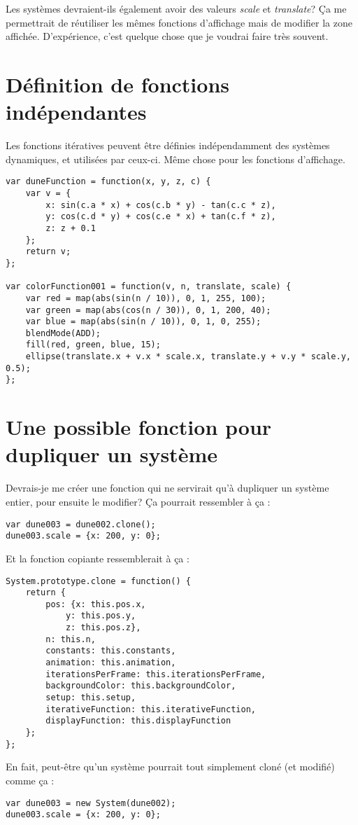 Les systèmes devraient-ils également avoir des valeurs \textit{scale} et \textit{translate}? Ça me permettrait de réutiliser les mêmes fonctions d'affichage mais de modifier la zone affichée. D'expérience, c'est quelque chose que je voudrai faire très souvent.

\newpage
\section{Définition de fonctions indépendantes}
Les fonctions itératives peuvent être définies indépendamment des systèmes dynamiques, et utilisées par ceux-ci. Même chose pour les fonctions d'affichage.
\begin{lstlisting}
var duneFunction = function(x, y, z, c) {
    var v = {
        x: sin(c.a * x) + cos(c.b * y) - tan(c.c * z),
        y: cos(c.d * y) + cos(c.e * x) + tan(c.f * z),
        z: z + 0.1
    };
    return v;
};

var colorFunction001 = function(v, n, translate, scale) {
    var red = map(abs(sin(n / 10)), 0, 1, 255, 100);
    var green = map(abs(cos(n / 30)), 0, 1, 200, 40);
    var blue = map(abs(sin(n / 10)), 0, 1, 0, 255);
    blendMode(ADD);
    fill(red, green, blue, 15);
    ellipse(translate.x + v.x * scale.x, translate.y + v.y * scale.y, 0.5);
};
\end{lstlisting}
\newpage
\section{Une possible fonction pour dupliquer un système}
Devrais-je me créer une fonction qui ne servirait qu'à dupliquer un système entier, pour ensuite le modifier? Ça pourrait ressembler à ça :

\begin{lstlisting}
var dune003 = dune002.clone();
dune003.scale = {x: 200, y: 0};
\end{lstlisting}

Et la fonction copiante ressemblerait à ça :
\begin{lstlisting}
System.prototype.clone = function() {
    return {
        pos: {x: this.pos.x, 
            y: this.pos.y, 
            z: this.pos.z},
        n: this.n,
        constants: this.constants,
        animation: this.animation,
        iterationsPerFrame: this.iterationsPerFrame,
        backgroundColor: this.backgroundColor,
        setup: this.setup,
        iterativeFunction: this.iterativeFunction,
        displayFunction: this.displayFunction
    };
};
\end{lstlisting}

En fait, peut-être qu'un système pourrait tout simplement cloné (et modifié) comme ça :
\begin{lstlisting}
var dune003 = new System(dune002);
dune003.scale = {x: 200, y: 0};
\end{lstlisting}